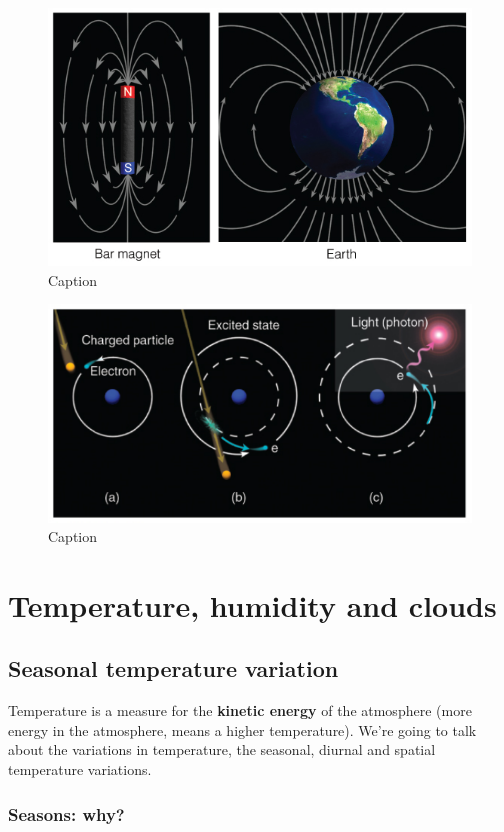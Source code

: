 \documentclass[12pt,oneside]{book}
\begin{document}
\begin{figure}

{\centering \includegraphics[width=0.5\linewidth]{figures/Figure145} 

}

\caption{Caption}\label{fig:borealis2}
\end{figure}

\begin{figure}

{\centering \includegraphics[width=0.5\linewidth]{figures/Figure146} 

}

\caption{Caption}\label{fig:borealis3}
\end{figure}

\chapter{Temperature, humidity and
clouds}\label{temperature-humidity-and-clouds}


\section{Seasonal temperature
variation}\label{seasonal-temperature-variation}

Temperature is a measure for the \textbf{kinetic energy} of the
atmosphere (more energy in the atmosphere, means a higher temperature).
We're going to talk about the variations in temperature, the seasonal,
diurnal and spatial temperature variations.

\subsection{Seasons: why?}\label{seasons-why}
\end{document}
